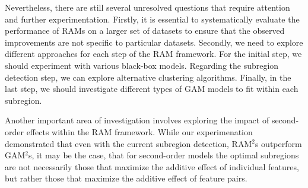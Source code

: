 \documentclass[12pt]{article}
\newcommand{\dfdx}{\frac{\partial f}{\partial x_s}}
\begin{document}
Nevertheless, there are still several unresolved questions that require attention and further experimentation.
Firstly, it is essential to systematically evaluate the performance of RAMs on a larger set of datasets to ensure that the observed improvements are not specific to particular datasets.
Secondly, we need to explore different approaches for each step of the RAM framework.
For the initial step, we should experiment with various black-box models.
Regarding the subregion detection step, we can explore alternative clustering algorithms.
Finally, in the last step, we should investigate different types of GAM models to fit within each subregion.

Another important area of investigation involves exploring the impact of second-order effects within the RAM framework.
While our experimenation demonstrated that even with the current subregion detection, RAM$^2$s outperform GAM$^2$s,
it may be the case, that for second-order models the optimal subregions are not necessarily those that maximize the additive effect of individual features,
but rather those that maximize the additive effect of feature pairs.

%
%
%
%
%
\end{document}

